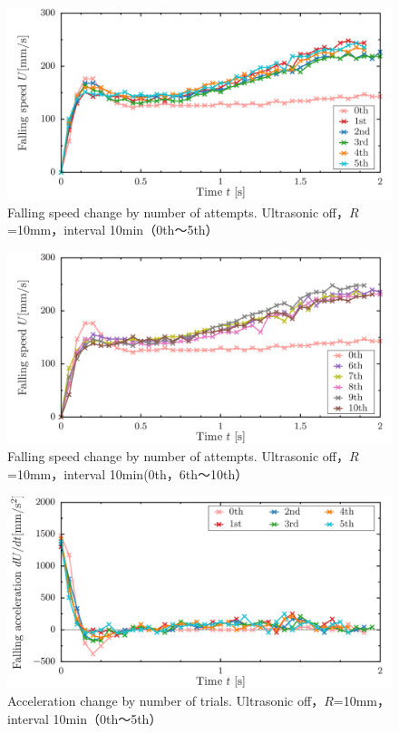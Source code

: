 \begin{figure}[ht]
    \begin{center}
        \includegraphics[width=15cm,clip]{5-Discussion/1-5.png}
        \caption{Falling speed change by number of attempts. Ultrasonic off，$R$=10mm，interval 10min（0th～5th）}
        \label{fig:1-5}
    \end{center}
\end{figure}
\begin{figure}[ht]
    \begin{center}
        \includegraphics[width=15cm,clip]{5-Discussion/6-10.png}
        \caption{Falling speed change by number of attempts. Ultrasonic off，$R$=10mm，interval 10min(0th，6th～10th）}
        \label{fig:6-10}
    \end{center}
\end{figure}
\begin{figure}[ht]
    \begin{center}
        \includegraphics[width=15cm,clip]{5-Discussion/1-5-a.png}
        \caption{Acceleration change by number of trials. Ultrasonic off，$R$=10mm，interval 10min（0th～5th）}
        \label{fig:1-5-a}
    \end{center}
\end{figure}
